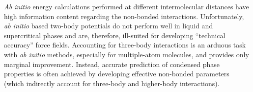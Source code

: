 \documentclass[12pt,a4paper]{article}
\begin{document}

%

\textit{Ab initio} energy calculations performed at different intermolecular distances have high information content regarding the non-bonded interactions. Unfortunately, \textit{ab initio} based two-body potentials do not perform well in liquid and supercritical phases and are, therefore, ill-suited for developing ``technical accuracy'' force fields. Accounting for three-body interactions is an arduous task with \textit{ab initio} methods, especially for multiple-atom molecules, and provides only marginal improvement. Instead, accurate prediction of condensed phase properties is often achieved by developing effective non-bonded parameters (which indirectly account for three-body and higher-body interactions).

%
\end{document}
